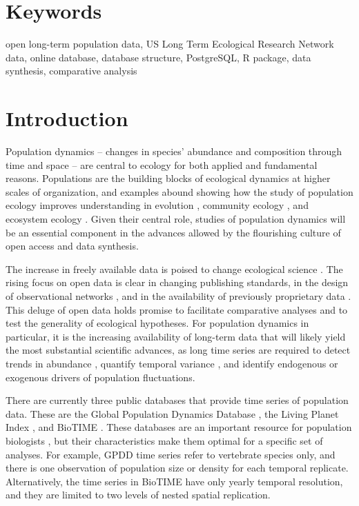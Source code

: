 \documentclass{article}\usepackage[]{graphicx}\usepackage[]{color}
\begin{document}
\section*{Keywords}
\linenumbers
open long-term population data, US Long Term Ecological Research Network data, online database, database structure, PostgreSQL, R package, data synthesis, comparative analysis

\newpage
\section*{Introduction}
\linenumbers

Population dynamics – changes in species’ abundance and composition through time and space – are central to ecology for both applied and fundamental reasons. Populations are the building blocks of ecological dynamics at higher scales of organization, and examples abound showing how the study of population ecology improves understanding in evolution \citep{Metcalf2007}, community ecology \citep{Levine2009}, and ecosystem ecology \citep{Medvigy2009,Fisher2018}. Given their central role, studies of population dynamics will be an essential component in the advances allowed by the flourishing culture of open access and data synthesis.

The increase in freely available data is poised to change ecological science \citep{Laurance2016}. The rising focus on open data is clear in changing publishing standards, in the design of observational networks \citep{schimel2007neon}, and in the availability of previously proprietary data \citep{Kratz2003,Bechtold2005}. This deluge of open data holds promise to facilitate comparative analyses and to test the generality of ecological hypotheses. For population dynamics in particular, it is the increasing availability of long-term data that will likely yield the most substantial scientific advances, as long time series are required to detect trends in abundance \citep{Lindenmayer2012}, quantify temporal variance \citep{Compagnoni2016}, and identify endogenous \citep{Knape2012} or exogenous \citep{Hampton2013} drivers of population fluctuations.

There are currently three public databases that provide time series of population data. These are the Global Population Dynamics Database \citep[GPDD,][]{Inchausti2001}, the Living Planet Index \citep{loh2005living}, and BioTIME \citep{dornelas2018biotime}. These databases are an important resource for population biologists \citep[e.g.,][]{Knape2012}, but their characteristics make them optimal for a specific set of analyses. For example, GPDD time series refer to vertebrate species only, and there is one observation of population size or density for each temporal replicate. Alternatively, the time series in BioTIME have only yearly temporal resolution, and they are limited to two levels of nested spatial replication.
\end{document}
